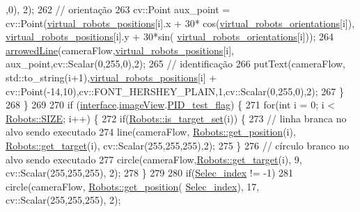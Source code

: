 \begin{DoxyCode}
      ,0), 2);
262                 \textcolor{comment}{// orientação}
263                 cv::Point aux\_point = cv::Point(\hyperlink{class_cam_cap_afdbec56c1e17c308441cf2eaad035e45}{virtual\_robots\_positions}[i].x + 30*
      cos(\hyperlink{class_cam_cap_af7519e2b0d2139c7ef95482fa3c03c20}{virtual\_robots\_orientations}[i]), 
      \hyperlink{class_cam_cap_afdbec56c1e17c308441cf2eaad035e45}{virtual\_robots\_positions}[i].y + 30*sin(
      \hyperlink{class_cam_cap_af7519e2b0d2139c7ef95482fa3c03c20}{virtual\_robots\_orientations}[i]));
264                 \hyperlink{class_cam_cap_afb044a7b5b3b2f17af62e3115e84993e}{arrowedLine}(cameraFlow,\hyperlink{class_cam_cap_afdbec56c1e17c308441cf2eaad035e45}{virtual\_robots\_positions}[i], 
      aux\_point,cv::Scalar(0,255,0),2);
265                 \textcolor{comment}{// identificação}
266                 putText(cameraFlow, std::to\_string(i+1),\hyperlink{class_cam_cap_afdbec56c1e17c308441cf2eaad035e45}{virtual\_robots\_positions}[i]
       + cv::Point(-14,10),cv::FONT\_HERSHEY\_PLAIN,1,cv::Scalar(0,255,0),2);
267             \}
268         \}
269 
270         \textcolor{keywordflow}{if} (\hyperlink{class_cam_cap_a58002893dfb61307042ddbba0c362dcd}{interface}.\hyperlink{class_v_s_s_s___g_u_i_1_1_v4_l_interface_a2c99f4d9fad8a34fa98d5b61beb06745}{imageView}.\hyperlink{class_image_view_ad94a51f7cd15b92c8c9defa5fb745b6d}{PID\_test\_flag}) \{
271             \textcolor{keywordflow}{for}(\textcolor{keywordtype}{int} i = 0; i < \hyperlink{class_robots_ae9df2f1d345ad6740f0459956cdd4712}{Robots::SIZE}; i++) \{
272                 \textcolor{keywordflow}{if}(\hyperlink{class_robots_ad79a530bb3c696a351f11f5698fb4960}{Robots::is\_target\_set}(i)) \{
273                     \textcolor{comment}{// linha branca no alvo sendo executado}
274                     line(cameraFlow, \hyperlink{class_robots_a1fca8f2f5070176faa6ba1efa2f1ff14}{Robots::get\_position}(i), 
      \hyperlink{class_robots_a8a4fe339df4823e45cf34d9fb8daa64b}{Robots::get\_target}(i), cv::Scalar(255,255,255),2);
275                 \}
276                 \textcolor{comment}{// círculo branco no alvo sendo executado}
277                 circle(cameraFlow,\hyperlink{class_robots_a8a4fe339df4823e45cf34d9fb8daa64b}{Robots::get\_target}(i), 9, cv::Scalar(255,255,255), 2);
278             \}
279 
280             \textcolor{keywordflow}{if}(\hyperlink{class_cam_cap_a26dab6605daa1e18cdced96ea1ad5cbf}{Selec\_index} != -1)
281                 circle(cameraFlow, \hyperlink{class_robots_a1fca8f2f5070176faa6ba1efa2f1ff14}{Robots::get\_position}(
      \hyperlink{class_cam_cap_a26dab6605daa1e18cdced96ea1ad5cbf}{Selec\_index}), 17, cv::Scalar(255,255,255), 2);

\end{DoxyCode}
